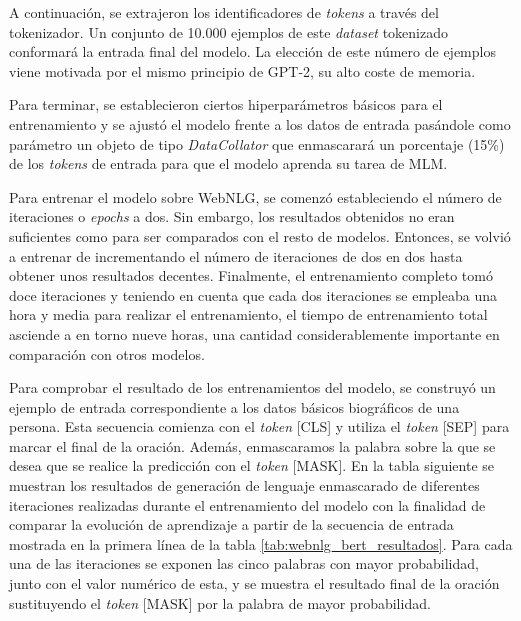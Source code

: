 A continuación, se extrajeron los identificadores de \textit{tokens} a través del tokenizador. Un conjunto de 10.000 ejemplos de este \textit{dataset} tokenizado conformará la entrada final del modelo. La elección de este número de ejemplos viene motivada por el mismo principio de GPT-2, su alto coste de memoria.
 
Para terminar, se establecieron ciertos hiperparámetros básicos para el entrenamiento  y se ajustó el modelo frente a los datos de entrada pasándole como parámetro un objeto de tipo \textit{DataCollator} que enmascarará un porcentaje (15\%) de los \textit{tokens} de entrada para que el modelo aprenda su tarea de MLM.


Para entrenar el modelo sobre WebNLG, se comenzó estableciendo el número de iteraciones o \textit{epochs} a dos. Sin embargo, los resultados obtenidos no eran suficientes como para ser comparados con el resto de modelos. Entonces, se volvió a entrenar de incrementando el número de iteraciones de dos en dos hasta obtener unos resultados decentes. Finalmente, el entrenamiento completo tomó doce iteraciones y teniendo en cuenta que cada dos iteraciones se empleaba una hora y media para realizar el entrenamiento, el tiempo de entrenamiento total asciende a en torno nueve horas, una cantidad considerablemente importante en comparación con otros modelos.

Para comprobar el resultado de los entrenamientos del modelo, se construyó un ejemplo de entrada correspondiente a los datos básicos biográficos de una persona. Esta secuencia comienza con el \textit{token} [CLS] y utiliza el \textit{token} [SEP] para marcar el final de la oración. Además, enmascaramos la palabra sobre la que se desea que se realice la predicción con el \textit{token} [MASK]. En la tabla siguiente se muestran los resultados de generación de lenguaje enmascarado de diferentes iteraciones realizadas durante el entrenamiento del modelo con la finalidad de comparar la evolución de aprendizaje a partir de la secuencia de entrada mostrada en la primera línea de la tabla \ref{tab:webnlg_bert_resultados}. Para cada una de las iteraciones se exponen las cinco palabras con mayor probabilidad, junto con el valor numérico de esta, y se muestra el resultado final de la oración sustituyendo el \textit{token} [MASK] por la palabra de mayor probabilidad.


